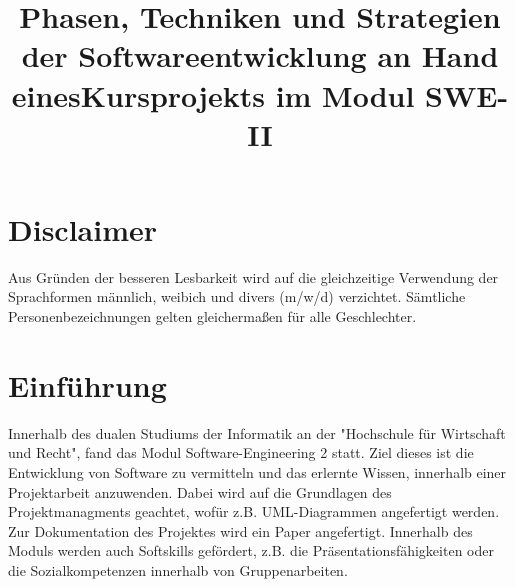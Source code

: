 \documentclass[conference]{IEEEtran}
\begin{document}
\title{Phasen, Techniken und Strategien der Softwareentwicklung an Hand einesKursprojekts im Modul SWE-II}

\author{
\and
{}
\and
{}
}

\maketitle


\section{Disclaimer}
Aus Gründen der besseren Lesbarkeit wird auf die gleichzeitige Verwendung der Sprachformen männlich, weibich und divers (m/w/d) verzichtet. Sämtliche Personenbezeichnungen gelten gleichermaßen für alle Geschlechter.

\section{Einführung}
Innerhalb des dualen Studiums der Informatik an der "Hochschule für Wirtschaft und Recht", fand das Modul Software-Engineering 2 statt. Ziel dieses ist die Entwicklung von Software zu vermitteln und das erlernte Wissen, innerhalb einer Projektarbeit anzuwenden. Dabei wird auf die Grundlagen des Projektmanagments geachtet, wofür z.B. UML-Diagrammen angefertigt werden. Zur Dokumentation des Projektes wird ein Paper angefertigt. 
Innerhalb des Moduls werden auch Softskills gefördert, z.B. die Präsentationsfähigkeiten oder die Sozialkompetenzen innerhalb von Gruppenarbeiten.
\end{document}
